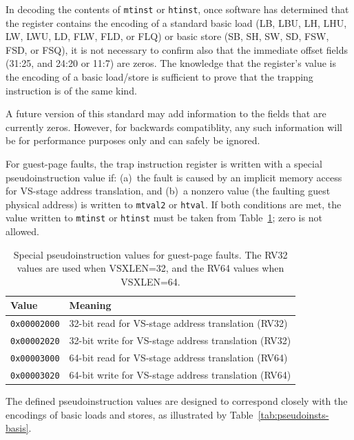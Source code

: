 \begin{commentary}
In decoding the contents of {\tt mtinst} or {\tt htinst}, once software
has determined that the register contains the encoding of a standard
basic load (LB, LBU, LH, LHU, LW, LWU, LD, FLW, FLD, or FLQ) or basic
store (SB, SH, SW, SD, FSW, FSD, or FSQ), it is not necessary to confirm
also that the immediate offset fields (31:25, and 24:20 or 11:7) are
zeros.
The knowledge that the register's value is the encoding of a basic
load/store is sufficient to prove that the trapping instruction is of the
same kind.

A future version of this standard may add information to the fields that
are currently zeros.
However, for backwards compatiblity, any such information will be for
performance purposes only and can safely be ignored.
\end{commentary}

For guest-page faults, the trap instruction register is written with a
special pseudoinstruction value if:
(a)~the fault is caused by an implicit memory access for VS-stage address
translation, and
(b)~a nonzero value (the faulting guest physical address) is written to
{\tt mtval2} or {\tt htval}.
If both conditions are met, the value written to {\tt mtinst} or
{\tt htinst} must be taken from Table~\ref{tab:pseudoinsts};
zero is not allowed.

\begin{table}[h!]
\begin{center}
\begin{tabular}{|l|l|}
\hline
Value            & Meaning \\
\hline
{\tt 0x00002000} & 32-bit read for VS-stage address translation (RV32) \\
{\tt 0x00002020} & 32-bit write for VS-stage address translation (RV32) \\
\hline
{\tt 0x00003000} & 64-bit read for VS-stage address translation (RV64) \\
{\tt 0x00003020} & 64-bit write for VS-stage address translation (RV64) \\
\hline
\end{tabular}
\end{center}
\caption{Special pseudoinstruction values for guest-page faults.
The RV32 values are used when VSXLEN=32, and the RV64 values when VSXLEN=64.}
\label{tab:pseudoinsts}
\end{table}

The defined pseudoinstruction values are designed to correspond closely
with the encodings of basic loads and stores, as illustrated by
Table~\ref{tab:pseudoinsts-basis}.

